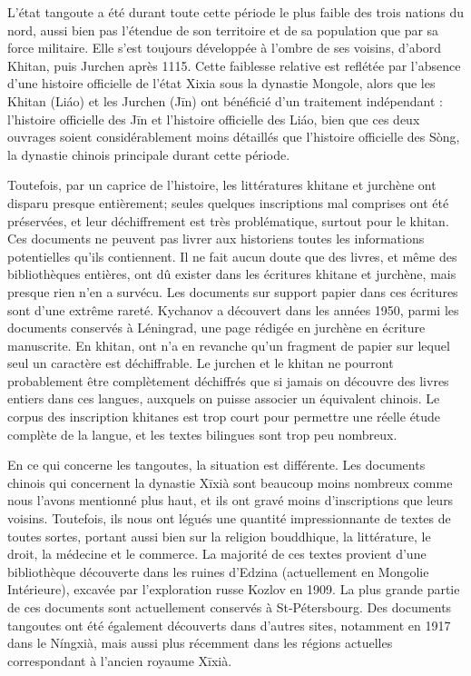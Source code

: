 \documentclass[oldfontcommands,oneside,a4paper,11pt]{memoir}
\newcommand{\ipa}[1]{{\phon #1}} %
\begin{document}
L'état tangoute a été durant toute cette période le plus faible des trois nations du nord, aussi bien pas l'étendue de son territoire et de sa population que par sa force militaire. Elle s'est toujours développée à l'ombre de ses voisins, d'abord Khitan, puis Jurchen après 1115. Cette faiblesse relative est reflétée par l'absence d'une histoire officielle de l'état Xixia sous la dynastie Mongole, alors que les Khitan (Liáo) et les Jurchen (Jīn) ont bénéficié d'un traitement indépendant : \ipa{l'histoire officielle des Jīn} et \ipa{l'histoire officielle des Liáo}, bien que ces deux ouvrages soient considérablement moins détaillés que \ipa{l'histoire officielle des Sòng}, la dynastie chinois principale durant cette période.

Toutefois, par un caprice de l'histoire, les littératures khitane et jurchène ont disparu presque entièrement; seules quelques inscriptions mal comprises ont été préservées, et leur déchiffrement est très problématique, surtout pour le khitan. Ces documents ne peuvent pas livrer aux historiens toutes les informations potentielles qu'ils contiennent. Il ne fait aucun doute que des livres, et même des bibliothèques entières, ont dû exister dans les écritures khitane et jurchène, mais presque rien n'en a survécu. Les documents sur support papier dans ces écritures sont d'une extrême rareté. Kychanov a découvert dans les années 1950, parmi les documents conservés à Léningrad, une page rédigée en jurchène en écriture manuscrite. En khitan, ont n'a en revanche qu'un fragment de papier sur lequel seul un caractère est déchiffrable. Le jurchen et le khitan ne pourront probablement être complètement déchiffrés que si jamais on découvre des livres entiers dans ces langues, auxquels on puisse associer un équivalent chinois. Le corpus des inscription khitanes est trop court pour permettre une réelle étude complète de la langue, et les textes bilingues sont trop peu nombreux.

En ce qui concerne les tangoutes, la situation est différente. Les documents chinois qui concernent la dynastie Xīxià sont beaucoup moins nombreux comme nous l'avons mentionné plus haut, et ils ont gravé moins d'inscriptions que leurs voisins. Toutefois, ils nous ont légués une quantité impressionnante de textes de toutes sortes, portant aussi bien sur la religion bouddhique, la littérature, le droit, la médecine et le commerce. La majorité de ces textes provient d'une bibliothèque découverte dans les ruines d'Edzina (actuellement en Mongolie Intérieure), excavée par l'exploration russe Kozlov en 1909. La plus grande partie de ces documents sont actuellement conservés à St-Pétersbourg. Des documents tangoutes ont été également découverts dans d'autres sites, notamment en 1917 dans le Níngxià, mais aussi plus récemment dans les régions actuelles correspondant à l'ancien royaume Xīxià.
\end{document}
